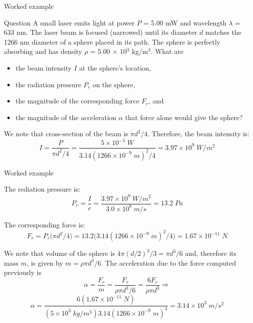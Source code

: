 {
\problemslide

\begin{frame}{Worked example}

\begin{blockexmplque}{Question}
  A small laser emits light at power $P$ = 5.00 mW and wavelength $\lambda$ = 633 nm.
  The laser beam is focused (narrowed) until its diameter $d$ matches the 1266 nm
  diameter of a sphere placed in its path. The sphere is perfectly absorbing
  and has density $\rho$ = 5.00 $\times$ 10$^3$ kg/m$^3$.
  What are
  \begin{itemize}
  \item the beam intensity $I$ at the sphere's location,
  \item the radiation pressure $P_r$ on the sphere,
  \item the magnitude of the corresponding force $F_r$, and
  \item the magnitude of the acceleration $\alpha$ that force alone would give the sphere?
  \end{itemize}
\end{blockexmplque}

We note that cross-section of the beam is $\pi d^2/4$.
Therefore, the beam intensity is:
\begin{equation*}
   I = \frac{P}{\pi d^2 / 4}
     = \frac{5 \times 10^{-3} \; W}{3.14 (1266 \times 10^{-9} \; m)^2 / 4 }
     = 3.97 \times 10^9 \; W/m^2
\end{equation*}

\end{frame}

%
%
%
%

\begin{frame}{Worked example}

The rediation pressure is:
\begin{equation*}
   P_r = \frac{I}{c}
       = \frac{3.97 \times 10^9 \; W/m^2}{3.0 \times 10^8 \; m/s}
       = 13.2 \; Pa
\end{equation*}

The corresponding force is:
\begin{equation*}
   F_r = P_r \Big( \pi d^2 / 4 \Big)
       = 13.2 \Big(3.14 (1266 \times 10^{-9} \; m)^2 / 4 \Big)
       = 1.67 \times 10^{-11} \; N
\end{equation*}

We note that volume of the sphere is $4\pi(d/2)^3/3 = \pi d^3/6$ and,
therefore its mass $m$, is given by $m = \rho \pi d^3/6$.
The acceleration due to the force computed previously is
\begin{equation*}
   \alpha = \frac{F_r}{m} = \frac{F_r}{\rho \pi d^3/6} = \frac{6 F_r}{\rho \pi d^3} \Rightarrow
\end{equation*}
\begin{equation*}
   \alpha = \frac{6 (1.67 \times 10^{-11} \; N)}{(5 \times 10^3 \; kg/m^3) 3.14 (1266 \times 10^{-9} \; m)^3}
          = 3.14 \times 10^3 \; m/s^2
\end{equation*}

\end{frame}

} %


